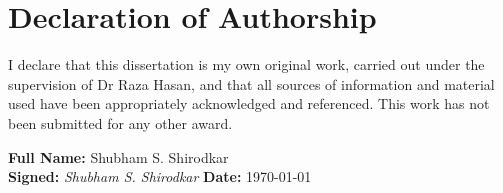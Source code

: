 \chapter*{Declaration of Authorship}

I declare that this dissertation is my own original work, carried out under
the supervision of Dr Raza Hasan, and that all sources of information and
material used have been appropriately acknowledged and referenced. This work
has not been submitted for any other award.

\vspace{1.5cm}

\noindent \textbf{Full Name:} Shubham S. Shirodkar \\[0.4cm]
\textbf{Signed:} \textit{Shubham S. Shirodkar} \hfill \textbf{Date:} \today
\clearpage
